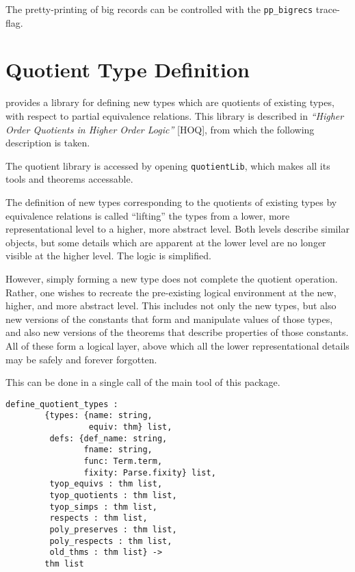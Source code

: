The pretty-printing of big records can be controlled with the
\texttt{pp\_bigrecs} trace-flag.


\section{Quotient Type Definition}\label{quotients}

\HOL{} provides a library for defining new types which are quotients
of existing types, with respect to partial equivalence relations.
This library is described in {\it ``Higher Order Quotients in Higher
Order Logic''} [HOQ], from which the following description is taken.

The quotient library is accessed by opening {\tt quotientLib},
which makes all its tools and theorems accessable.

The definition of new types corresponding to the quotients of
existing types by equivalence relations is called ``lifting''
the types from a lower, more representational level to a higher,
more abstract level.  Both levels describe similar objects, but
some details which are apparent at the lower level are no longer
visible at the higher level.  The logic is simplified.

However, simply forming a new type does not complete the quotient operation.
Rather, one wishes to recreate the
pre-existing logical environment at the new,
higher, and more abstract level.  This includes not only the new
types, but also new versions of the constants that form and
manipulate values of those types, and also new versions of the
theorems that describe properties of those constants.  All of these
form a logical layer, above which all the lower representational details
may be safely and forever forgotten.

This can be done in a single call of the
main tool of this package.

\begin{verbatim}
define_quotient_types :
        {types: {name: string,
                 equiv: thm} list,
         defs: {def_name: string,
                fname: string,
                func: Term.term,
                fixity: Parse.fixity} list,
         tyop_equivs : thm list,
         tyop_quotients : thm list,
         tyop_simps : thm list,
         respects : thm list,
         poly_preserves : thm list,
         poly_respects : thm list,
         old_thms : thm list} ->
        thm list
\end{verbatim}

